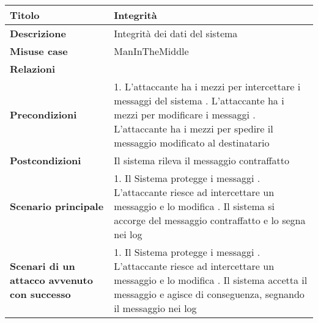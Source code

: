 \begin{tabular} {|P{4cm}|P{13cm}|}
\hline
\textbf{Titolo} & Integrità\\
\hline
  \textbf{Descrizione} & Integrità dei dati del sistema\\
\hline
  \textbf{Misuse case} & ManInTheMiddle\\
\hline
  \textbf{Relazioni} &\\
\hline
  \textbf{Precondizioni} & 1. L'attaccante ha i mezzi per intercettare i
  messaggi del sistema . L'attaccante ha i mezzi per modificare i messaggi
  . L'attaccante ha i mezzi per spedire il messaggio modificato al
  destinatario\\
\hline
  \textbf{Postcondizioni} & Il sistema rileva il messaggio contraffatto\\
\hline
  \textbf{Scenario principale} & 1. Il Sistema protegge i messaggi . L'attaccante riesce ad intercettare un messaggio e lo modifica . Il
  sistema si accorge del messaggio contraffatto e lo segna nei log\\
\hline
  \textbf{Scenari di un attacco avvenuto con successo} & 1. Il Sistema protegge
  i messaggi . L'attaccante riesce ad intercettare un messaggio e
  lo modifica . Il sistema accetta il messaggio e agisce di conseguenza,
  segnando il messaggio nei log\\
\hline
\end{tabular}
\\

